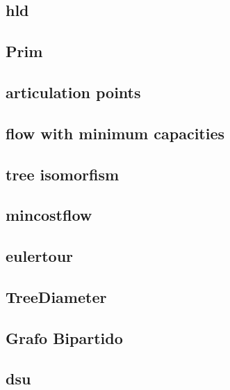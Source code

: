 \subsection{hld}
\raggedbottom
\hrulefill
\subsection{Prim}
\raggedbottom
\hrulefill
\subsection{articulation points}
\raggedbottom
\hrulefill
\subsection{flow with minimum capacities}
\raggedbottom
\hrulefill
\subsection{tree isomorfism}
\raggedbottom
\hrulefill
\subsection{mincostflow}
\raggedbottom
\hrulefill
\subsection{eulertour}
\raggedbottom
\hrulefill
\subsection{TreeDiameter}
\raggedbottom
\hrulefill
\subsection{Grafo Bipartido}
\raggedbottom
\hrulefill
\subsection{dsu}
\raggedbottom
\hrulefill

